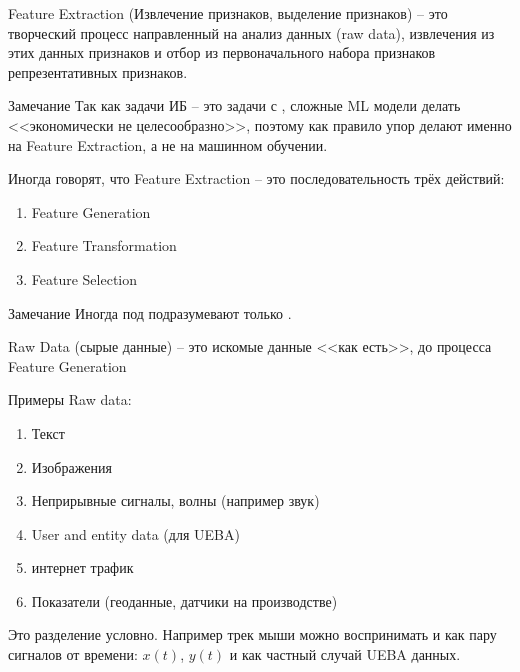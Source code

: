 \begin{frame}{Feature Extraction}
	(Извлечение признаков, выделение признаков) 
	-- это творческий процесс
	направленный на анализ данных (raw data),
	извлечения из этих данных признаков
	и отбор из первоначального набора признаков 
	репрезентативных признаков.
	
	\begin{block}{Замечание}
	Так как задачи ИБ -- это задачи с ,
	сложные ML модели делать <<экономически не целесообразно>>,
	поэтому как правило упор делают именно на Feature Extraction,
	а не на машинном обучении.
	\end{block}
\end{frame}

\begin{frame}
	Иногда говорят, что Feature Extraction -- это последовательность трёх действий:
	\begin{enumerate}
		\item Feature Generation 
		\item Feature Transformation 
		\item Feature Selection
	\end{enumerate}
	
	\begin{block}{Замечание}
	Иногда под 
	подразумевают только .
	\end{block}
\end{frame}

\begin{frame}{Raw Data}
	 (сырые данные) -- это искомые данные <<как есть>>, до процесса
	Feature Generation
	
	Примеры Raw data:
	\begin{enumerate}
		\item Текст
		\item Изображения
		\item Неприрывные сигналы, волны (например звук)
		\item User and entity data (для UEBA)
		\item интернет трафик
		\item Показатели (геоданные, датчики на производстве) 
	\end{enumerate}
	
	Это разделение условно. Например трек мыши можно воспринимать и
	как пару сигналов от времени: $x(t)$, $y(t)$ и как частный случай
	UEBA данных.
\end{frame}

